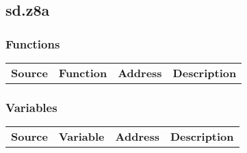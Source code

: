 \subsection{sd.z8a}
\subsubsection{Functions}
\begin{tabular}{rllp{7cm}}
 \textbf{Source}&\textbf{Function}&\textbf{Address}&\textbf{Description}\\
\end{tabular}

\subsubsection{Variables}
\begin{tabular}{rllp{7cm}}
 \textbf{Source}&\textbf{Variable}&\textbf{Address}&\textbf{Description}\\
\end{tabular}

